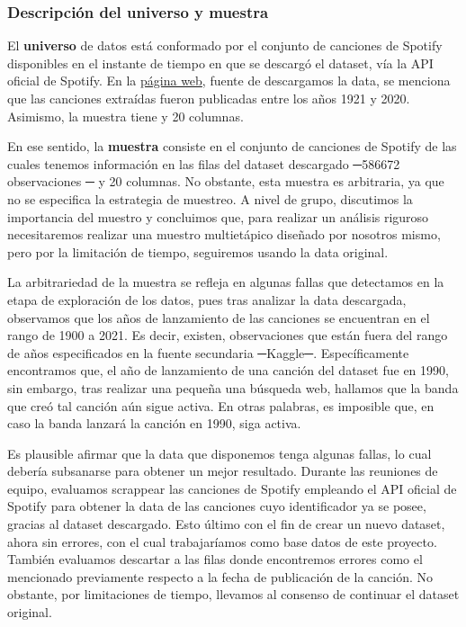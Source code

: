 \documentclass[
  letterpaper,
  DIV=11,
  numbers=noendperiod]{scrartcl}
\begin{document}
\hypertarget{descripciuxf3n-del-universo-y-muestra}{%
\subsubsection{Descripción del universo y
muestra}\label{descripciuxf3n-del-universo-y-muestra}}

El \textbf{universo} de datos está conformado por el conjunto de
canciones de Spotify disponibles en el instante de tiempo en que se
descargó el dataset, vía la API oficial de Spotify. En la
\href{https://www.kaggle.com/datasets/yamaerenay/spotify-dataset-19212020-600k-tracks?resource=download}{página
web}, fuente de descargamos la data, se menciona que las canciones
extraídas fueron publicadas entre los años 1921 y 2020. Asimismo, la
muestra tiene y 20 columnas.

En ese sentido, la \textbf{muestra} consiste en el conjunto de canciones
de Spotify de las cuales tenemos información en las filas del dataset
descargado ─586672 observaciones ─ y 20 columnas. No obstante, esta
muestra es arbitraria, ya que no se especifica la estrategia de
muestreo. A nivel de grupo, discutimos la importancia del muestro y
concluimos que, para realizar un análisis riguroso necesitaremos
realizar una muestro multietápico diseñado por nosotros mismo, pero por
la limitación de tiempo, seguiremos usando la data original.

La arbitrariedad de la muestra se refleja en algunas fallas que
detectamos en la etapa de exploración de los datos, pues tras analizar
la data descargada, observamos que los años de lanzamiento de las
canciones se encuentran en el rango de 1900 a 2021. Es decir, existen,
observaciones que están fuera del rango de años especificados en la
fuente secundaria ─Kaggle─. Específicamente encontramos que, el año de
lanzamiento de una canción del dataset fue en 1990, sin embargo, tras
realizar una pequeña una búsqueda web, hallamos que la banda que creó
tal canción aún sigue activa. En otras palabras, es imposible que, en
caso la banda lanzará la canción en 1990, siga activa.

Es plausible afirmar que la data que disponemos tenga algunas fallas, lo
cual debería subsanarse para obtener un mejor resultado. Durante las
reuniones de equipo, evaluamos scrappear las canciones de Spotify
empleando el API oficial de Spotify para obtener la data de las
canciones cuyo identificador ya se posee, gracias al dataset descargado.
Esto último con el fin de crear un nuevo dataset, ahora sin errores, con
el cual trabajaríamos como base datos de este proyecto. También
evaluamos descartar a las filas donde encontremos errores como el
mencionado previamente respecto a la fecha de publicación de la canción.
No obstante, por limitaciones de tiempo, llevamos al consenso de
continuar el dataset original.
\end{document}
